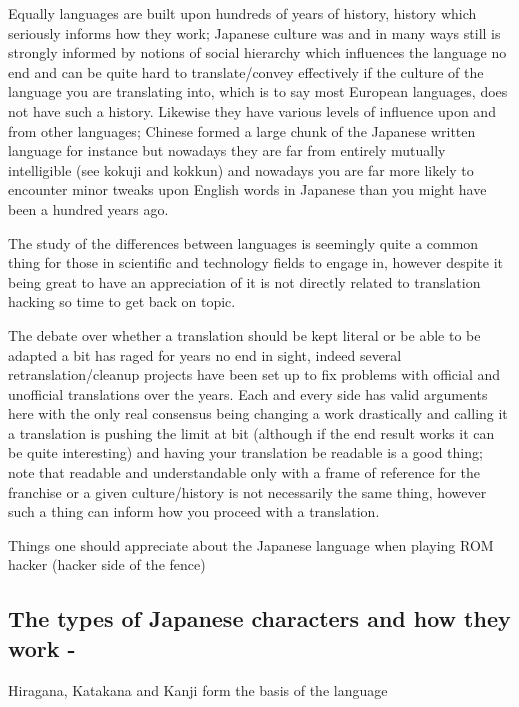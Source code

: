 \documentclass[
]{book}
\begin{document}
Equally languages are built upon hundreds of years of history, history which seriously informs how they work; Japanese culture was and in many ways still is strongly informed by notions of social hierarchy which influences the language no end and can be quite hard to translate/convey effectively if the culture of the language you are translating into, which is to say most European languages, does not have such a history. Likewise they have various levels of influence upon and from other languages; Chinese formed a large chunk of the Japanese written language for instance but nowadays they are far from entirely mutually intelligible (see kokuji and kokkun) and nowadays you are far more likely to encounter minor tweaks upon English words in Japanese than you might have been a hundred years ago.

The study of the differences between languages is seemingly quite a common thing for those in scientific and technology fields to engage in, however despite it being great to have an appreciation of it is not directly related to translation hacking so time to get back on topic.

The debate over whether a translation should be kept literal or be able to be adapted a bit has raged for years no end in sight, indeed several retranslation/cleanup projects have been set up to fix problems with official and unofficial translations over the years. Each and every side has valid arguments here with the only real consensus being changing a work drastically and calling it a translation is pushing the limit at bit (although if the end result works it can be quite interesting) and having your translation be readable is a good thing; note that readable and understandable only with a frame of reference for the franchise or a given culture/history is not necessarily the same thing, however such a thing can inform how you proceed with a translation.

Things one should appreciate about the Japanese language when playing ROM hacker (hacker side of the fence)

\hypertarget{the-types-of-japanese-characters-and-how-they-work--}{%
\subsection{The types of Japanese characters and how they work -}\label{the-types-of-japanese-characters-and-how-they-work--}}

Hiragana, Katakana and Kanji form the basis of the language
\end{document}
